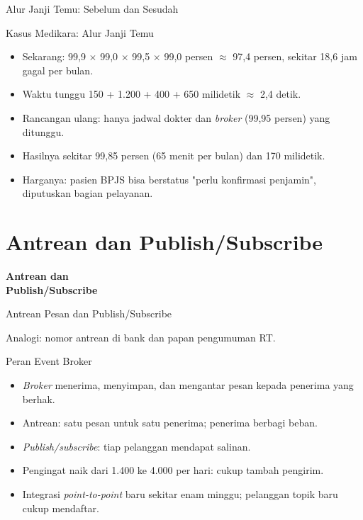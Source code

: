 \documentclass[aspectratio=169, table, 12pt]{beamer}
\begin{document}
\begin{frame}{{\Large Alur Janji Temu: Sebelum dan Sesudah}}
  \centering
\end{frame}

\begin{frame}{{\Large Kasus Medikara: Alur Janji Temu}}
  \vspace{6pt}
  \begin{itemize}
    \item Sekarang: 99,9 $\times$ 99,0 $\times$ 99,5 $\times$ 99,0 persen
          $\approx$ 97,4 persen, sekitar 18,6 jam gagal per bulan.
    \item Waktu tunggu 150 + 1.200 + 400 + 650 milidetik $\approx$ 2,4 detik.
    \item Rancangan ulang: hanya jadwal dokter dan \textit{broker} (99,95
          persen) yang ditunggu.
    \item Hasilnya sekitar 99,85 persen (65 menit per bulan) dan 170 milidetik.
    \item Harganya: pasien BPJS bisa berstatus "perlu konfirmasi penjamin",
          diputuskan bagian pelayanan.
  \end{itemize}
\end{frame}

\section{Antrean dan Publish/Subscribe}

\begin{frame}{\hfill}
  \centering
  \Huge{\textbf{Antrean dan\\Publish/Subscribe}}
\end{frame}

\begin{frame}{{\Large Antrean Pesan dan Publish/Subscribe}}
  \centering

  \vspace{6pt}
  \small
  Analogi: nomor antrean di bank dan papan pengumuman RT.
\end{frame}

\begin{frame}{{\Large Peran Event Broker}}
  \vspace{6pt}
  \begin{itemize}
    \item \textit{Broker} menerima, menyimpan, dan mengantar pesan kepada
          penerima yang berhak.
    \item Antrean: satu pesan untuk satu penerima; penerima berbagi beban.
    \item \textit{Publish/subscribe}: tiap pelanggan mendapat salinan.
    \item Pengingat naik dari 1.400 ke 4.000 per hari: cukup tambah pengirim.
    \item Integrasi \textit{point-to-point} baru sekitar enam minggu; pelanggan
          topik baru cukup mendaftar.
  \end{itemize}
\end{frame}
\end{document}
